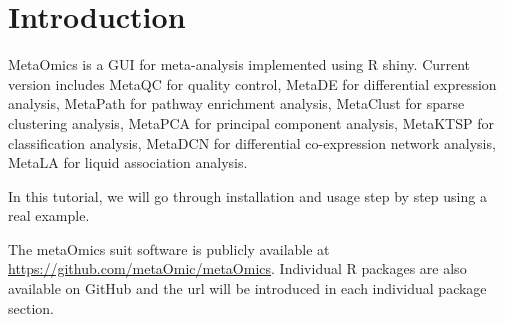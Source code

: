 \section{Introduction}
 
MetaOmics is a GUI for meta-analysis implemented using R shiny.
Current version includes MetaQC for quality control, 
MetaDE for differential expression analysis,
MetaPath for pathway enrichment analysis,
MetaClust for sparse clustering analysis,
MetaPCA for principal component analysis,
MetaKTSP for classification analysis,
MetaDCN for differential co-expression network analysis,
MetaLA for liquid association analysis.

In this tutorial, 
we will go through installation and usage step by step using a real example.

The metaOmics suit software is publicly available at \url{https://github.com/metaOmic/metaOmics}.
Individual R packages are also available on GitHub and the url will be introduced in each individual package section.

